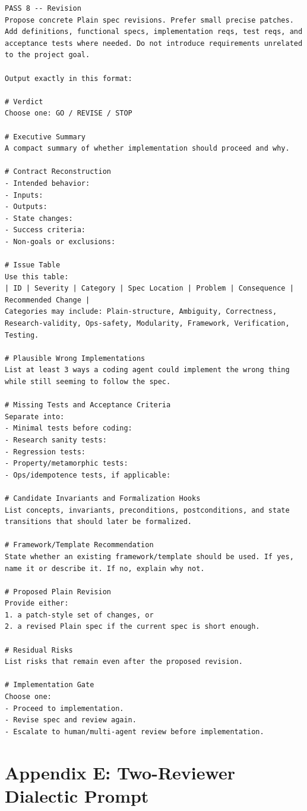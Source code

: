 \documentclass[11pt]{article}
\begin{document}
\begin{lstlisting}
PASS 8 -- Revision
Propose concrete Plain spec revisions. Prefer small precise patches. Add definitions, functional specs, implementation reqs, test reqs, and acceptance tests where needed. Do not introduce requirements unrelated to the project goal.

Output exactly in this format:

# Verdict
Choose one: GO / REVISE / STOP

# Executive Summary
A compact summary of whether implementation should proceed and why.

# Contract Reconstruction
- Intended behavior:
- Inputs:
- Outputs:
- State changes:
- Success criteria:
- Non-goals or exclusions:

# Issue Table
Use this table:
| ID | Severity | Category | Spec Location | Problem | Consequence | Recommended Change |
Categories may include: Plain-structure, Ambiguity, Correctness, Research-validity, Ops-safety, Modularity, Framework, Verification, Testing.

# Plausible Wrong Implementations
List at least 3 ways a coding agent could implement the wrong thing while still seeming to follow the spec.

# Missing Tests and Acceptance Criteria
Separate into:
- Minimal tests before coding:
- Research sanity tests:
- Regression tests:
- Property/metamorphic tests:
- Ops/idempotence tests, if applicable:

# Candidate Invariants and Formalization Hooks
List concepts, invariants, preconditions, postconditions, and state transitions that should later be formalized.

# Framework/Template Recommendation
State whether an existing framework/template should be used. If yes, name it or describe it. If no, explain why not.

# Proposed Plain Revision
Provide either:
1. a patch-style set of changes, or
2. a revised Plain spec if the current spec is short enough.

# Residual Risks
List risks that remain even after the proposed revision.

# Implementation Gate
Choose one:
- Proceed to implementation.
- Revise spec and review again.
- Escalate to human/multi-agent review before implementation.
\end{lstlisting}

\section{Appendix E: Two-Reviewer Dialectic Prompt}
\end{document}
